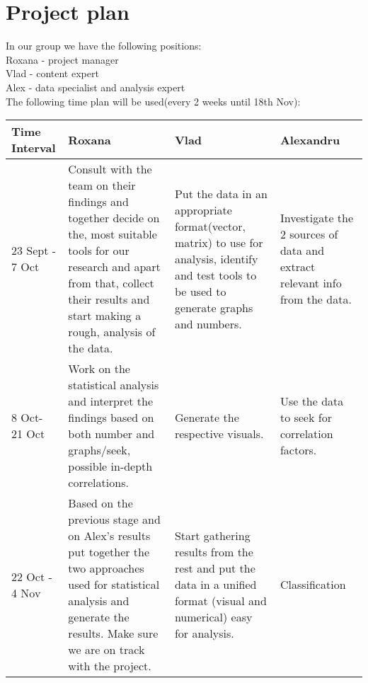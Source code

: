 
\section{Project plan}

In our group we have the following positions:\\
Roxana - project manager\\
Vlad - content expert\\
Alex - data specialist and analysis expert\\

The following time plan will be used(every 2 weeks until 18th Nov):\\


    \begin{tabular}{|p{2.5cm}|p{4.8cm}|p{4.8cm}|p{4.8cm}|}
    \hline
    Time Interval   & Roxana                                                                                                                                                                                              & Vlad                                                                                                                                          & Alexandru                                                                  \\ \hline
    23 Sept - 7 Oct & Consult with the team on their findings and together decide on the, most suitable tools for our research and apart from that, collect their results and start making a rough, analysis of the data. & Put the data in an appropriate format(vector, matrix) to use for analysis, identify and test tools to be used to generate graphs and numbers. & Investigate the 2 sources of data and extract relevant info from the data. \\ \hline
    8 Oct- 21 Oct   & Work on the statistical analysis  and interpret the findings based on both number and graphs/seek, possible in-depth correlations.                                                                   & Generate the respective visuals.                                                                                                              & Use the data to seek for correlation factors.                              \\ \hline
    22 Oct - 4 Nov  & Based on the previous stage and on Alex's results put together the two approaches used for statistical analysis and generate the results. Make sure we are on track with the project.               & Start gathering results from the rest and put the data in a unified format (visual and numerical) easy for analysis.                          & Classification                                                             \\ \hline

\end{tabular}
